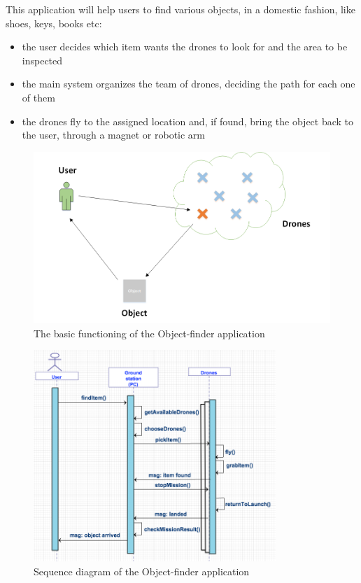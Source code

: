 This application will help users to find various objects, in a domestic fashion, like shoes, keys, books etc:

\begin{itemize}
\itemsep2pt
\item{
the user decides which item wants the drones to look for and the area to be inspected
}
\item{
the main system organizes the team of drones, deciding the path for each one of them
}
\item{
the drones fly to the assigned location and, if found, bring the object back to the user, through a magnet or robotic arm
}
\end{itemize}


\begin{figure}[H]
  \centering
  \includegraphics[width=\linewidth]{pictures/OF.png}
  \caption{The basic functioning of the Object-finder application}
  \label{fig:OF}
\end{figure}


\begin{figure}[H]
  \centering
  \includegraphics[width=\linewidth, height=8cm]{pictures/OF_sequence.png}
    \caption{Sequence diagram of the Object-finder application}
  \label{fig:OFSequence}
\end{figure}


